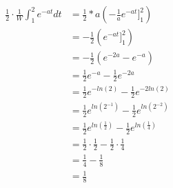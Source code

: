 \documentclass[9pt]{article}
\begin{document}
\begin{align*}
  \frac{1}{2} \cdot \frac{1}{W} \int_1^2 e^{-at} dt &= \frac{1}{2} * a(-\frac{1}{a} e^{-at} \bigg]_1^2) \\
  &= -\frac{1}{2} (e^{-at} \bigg]_1^2) \\
  &= -\frac{1}{2} (e^{-2a} - e^{-a}) \\
  &= \frac{1}{2} e^{-a} - \frac{1}{2} e^{-2a} \\
  &= \frac{1}{2} e^{-ln(2)} - \frac{1}{2} e^{-2ln(2)} \\
  &= \frac{1}{2} e^{ln(2^{-1})} - \frac{1}{2} e^{ln(2^{-2})} \\
  &= \frac{1}{2} e^{ln(\frac{1}{2})} - \frac{1}{2} e^{ln(\frac{1}{4})} \\
  &= \frac{1}{2} \cdot \frac{1}{2} - \frac{1}{2} \cdot \frac{1}{4} \\
  &= \frac{1}{4} - \frac{1}{8} \\
  &= \frac{1}{8}
\end{align*}
\end{document}
